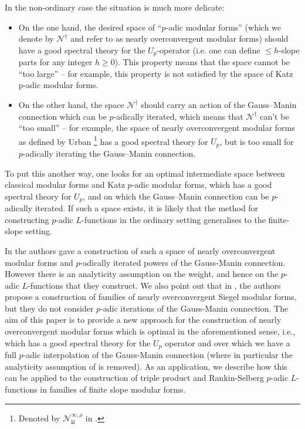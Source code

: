 \documentclass[10pt, oneside]{amsart}
\numberwithin{equation}{subsection}
\theoremstyle{definition}
\theoremstyle{remark}
\begin{document}
In the non-ordinary case the situation is much more delicate:
\begin{itemize} 
\item On the one hand, the desired space of ``$p$-adic modular forms'' (which we denote by $\mathscr{N}^{\dagger}$ and refer to as nearly overconvergent modular forms) should have a good spectral theory for the $U_p$-operator (i.e. one can define $\leq h$-slope parts for any integer $h \geq 0$). This property means that the space cannot be ``too large'' -- for example, this property is not satisfied by the space of Katz p-adic modular forms.
\item On the other hand, the space $\mathscr{N}^{\dagger}$ should carry an action of the Gauss--Manin connection which can be $p$-adically iterated, which means that $\mathscr{N}^{\dagger}$ can't be ``too small'' -- for example, the space of nearly overconvergent modular forms as defined by Urban \cite{Urban}\footnote{Denoted by $\mathcal{N}^{\infty, \rho}_{\mathfrak{U}}$ in \cite[\S 3.3]{Urban}.} has a good spectral theory for $U_p$, but is too small for $p$-adically iterating the Gauss--Manin connection.
\end{itemize}
To put this another way, one looks for an optimal intermediate space between classical modular forms and Katz $p$-adic modular forms, which has a good spectral theory for $U_p$, and on which the Gauss--Manin connection can be $p$-adically iterated. If such a space exists, it is likely that the method for constructing $p$-adic $L$-functions in the ordinary setting generalises to the finite-slope setting.

In \cite{AI_LLL} the authors gave a construction of such a space of nearly overconvergent modular forms and $p$-adically iterated powers of the Gauss-Manin connection. However there is an analyticity assumption on the weight, and hence on the $p$-adic $L$-functions that they construct. We also point out that in \cite{HarronXiao}, the authors propose a construction of families of nearly overconvergent Siegel modular forms, but they do not consider $p$-adic iterations of the Gauss-Manin connection. The aim of this paper is to provide a new approach for the construction of nearly overconvergent modular forms which is optimal in the aforementioned sense, i.e., which has a good spectral theory for the $U_p$ operator and over which we have a full $p$-adic interpolation of the Gauss-Manin connection (where in particular the analyticity assumption of \cite{AI_LLL} is removed). As an application, we describe how this can be applied to the construction of triple product and Rankin-Selberg $p$-adic $L$-functions in families of finite slope modular forms.
\end{document}
